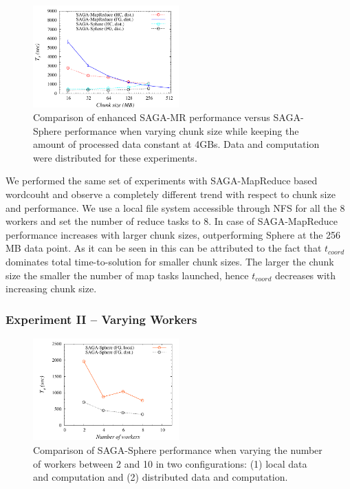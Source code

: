 \documentclass[3p,twocolumn]{elsarticle}
\begin{document}
\begin{figure}[htb!]
 \upp \upp
 \includegraphics[width=0.5\textwidth]{figures/sphere_mr_varying_chunksize.pdf}
 \upp \upp
 \caption{
   Comparison of enhanced SAGA-MR performance versus
   SAGA-Sphere performance when varying chunk size while keeping the amount
   of processed data constant at 4GBs. Data and computation were
   distributed for these experiments.
   \label{fig:sphere_mr_chunksize}
   }
\end{figure}

We performed the same set of experiments with SAGA-MapReduce based
wordcouht and observe a completely different trend with respect to
chunk size and performance. We use a local file system accessible
through NFS for all the 8 workers and set the number of reduce tasks
to 8.  In case of SAGA-MapReduce performance increases with larger
chunk sizes, outperforming Sphere at the 256 MB data point. As it can
be seen in  this can be attributed to the fact that
$t_{coord}$ dominates total time-to-solution for smaller chunk sizes.
The larger the chunk size the smaller the number of map tasks
launched, hence $t_{coord}$ decreases with increasing chunk size.


\subsubsection{Experiment II -- Varying Workers}

\begin{figure}[htb!]
 \includegraphics[width=0.5\textwidth]{figures/sphere_varying_workers.pdf}
 \caption{
   Comparison of SAGA-Sphere performance when varying the number of workers
   between 2 and 10 in two configurations: (1) local data and computation
   and (2) distributed data and computation.
   \label{fig:sphere_varying_workers}
   }
\end{figure}
\end{document}
